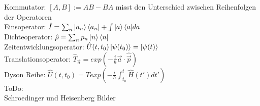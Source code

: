 \documentclass{article}
\begin{document}
Kommutator: $[A, B] := AB - BA$ misst den Unterschied zwischen Reihenfolgen der Operatoren \\

Einsoperator: $\hat{I}=\sum_n{\ket{a_n}\bra{a_n}} + \int{\ket{a}\bra{a}}da$ \\

Dichteoperator: $\hat{\rho}=\sum_n{p_n \ket{n}\bra{n}}$ \\

Zeitentwicklungsoperator: $\hat{U}(t, t_0)\ket{\psi(t_0)} = \ket{\psi(t)}$ \\


Translationsoperator: $\hat{T}_{\vec{a}} = exp \left( - \frac{i}{\hbar} \vec{a} \cdot \hat{\vec{p}} \right)$ \\


Dyson Reihe:  $\hat{U}(t, t_0) = T exp\left(-\frac{i}{\hbar} \int_{t_0}^t{\hat{H}(t')}dt' \right)$ \\

ToDo: \\
Schroedinger und Heisenberg Bilder
\end{document}
